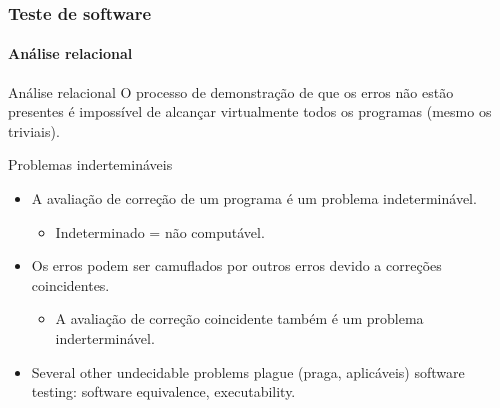 \begin{frame}
\frametitle{Teste de software}
\framesubtitle{Análise relacional}

\begin{block:principle}{Análise relacional}
O processo de demonstração de que os erros não estão presentes é impossível de alcançar virtualmente todos os programas (mesmo os triviais).
\end{block:principle}

\begin{block:fact}{Problemas indertemináveis}
\begin{itemize}
	\item A avaliação de correção de um programa é um problema indeterminável.
	\begin{itemize}
		\item Indeterminado = não computável.
	\end{itemize}

	\item Os erros podem ser camuflados por outros erros devido a correções coincidentes.
	\begin{itemize}
		\item A avaliação de correção coincidente também é um problema inderterminável.
	\end{itemize}

	\item Several other undecidable problems plague (praga, aplicáveis) software testing: software
	equivalence, executability.
\end{itemize}
\end{block:fact}
\end{frame}


